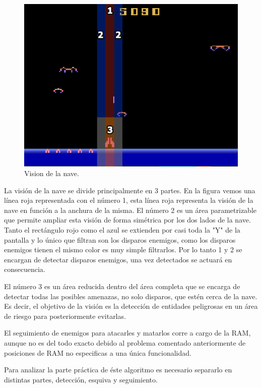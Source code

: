 \begin{figure}[H]
	\centering
	\includegraphics[width=1\textwidth]{Figures/demonAttackVision}
	\caption{Vision de la nave.}
	\label{fig:demonAttackVision}
\end{figure}

La visión de la nave se divide principalmente en 3 partes. En la figura vemos una línea roja representada con el número 1, esta línea roja representa la visión de la nave en función a la anchura de la misma. El número 2 es un área parametrizable que permite ampliar esta visión de forma simétrica por los dos lados de la nave. Tanto el rectángulo rojo como el azul se extienden por casi toda la "Y" de la pantalla y lo único que filtran son los disparos enemigos, como los disparos enemigos tienen el mismo color es muy simple filtrarlos. Por lo tanto 1 y 2 se encargan de detectar disparos enemigos, una vez detectados se actuará en consecuencia.

El número 3 es un área reducida dentro del área completa que se encarga de detectar todas las posibles amenazas, no solo disparos, que estén cerca de la nave. Es decir, el objetivo de la visión es la detección de entidades peligrosas en un área de riesgo para posteriormente evitarlas.

El seguimiento de enemigos para atacarles y matarlos corre a cargo de la RAM, aunque no es del todo exacto debido al problema comentado anteriormente de posiciones de RAM no especificas a una única funcionalidad.

Para analizar la parte práctica de éste algoritmo es necesario separarlo en distintas partes, detección, esquiva y seguimiento.

